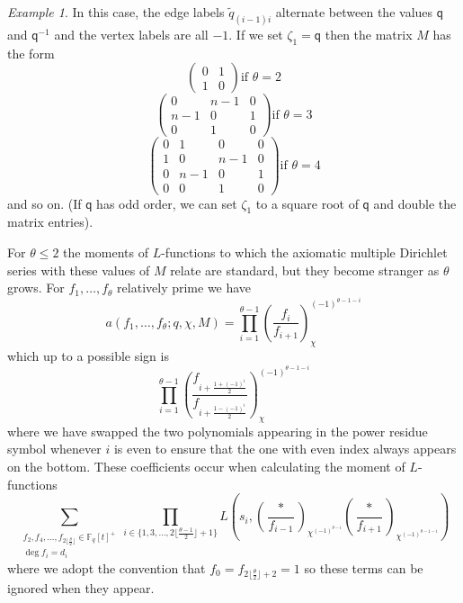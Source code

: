 \documentclass[11pt,letterpaper]{article}
\theoremstyle{definition}
\theoremstyle{remark}
\newtheorem{example}[theorem]{Example}
\numberwithin{equation}{section}
\theoremstyle{dotless}
\newcommand{\gene}{\zeta_1} %
\newcommand{\qq}{\mathbf{ \mathsf{q}}} %
\renewcommand{\tilde}{\widetilde}
\begin{document}
\begin{example}
In this case, the edge labels $\tilde{q}_{(i-1) i}$ alternate between the values $\qq$ and $\qq^{-1}$ and the vertex labels are all $-1$. If we set $\gene=\qq$ then the matrix $M$ has the form \[ \begin{pmatrix} 0 & 1 \\ 1 & 0 \end{pmatrix} \textrm{if } \theta=2\]\[ \begin{pmatrix} 0 & n-1 & 0  \\ n-1 & 0 & 1 \\ 0 & 1 & 0  \end{pmatrix} \textrm{if } \theta=3\]
\[ \begin{pmatrix} 0 & 1 & 0 & 0 \\ 1 & 0 & n-1 & 0 \\ 0 & n-1 & 0 & 1 \\ 0 & 0 & 1 & 0  \end{pmatrix} \textrm{if } \theta=4\]
and so on. (If $\qq$ has odd order, we can set $\gene$ to a square root of $\qq$ and double the matrix entries). 


For $\theta \leq 2$ the moments of $L$-functions to which the axiomatic multiple Dirichlet series with these values of $M$ relate are standard, but they become stranger as $\theta$ grows. For $f_1,\dots, f_\theta$ relatively prime we have
\[a(f_1,\dots,f_\theta; q, \chi, M) = \prod_{i=1}^{\theta-1} \left( \frac{f_i}{f_{i+1}} \right)_{\chi}^{ (-1)^{\theta-1-i}}\]
which up to a possible sign is
\[ \prod_{i=1}^{\theta-1} \left( \frac{f_{ i+ \frac{ 1 + (-1)^i}{2}}}{f_{i+\frac{ 1 - (-1)^i}{2}}} \right)_{\chi}^{ (-1)^{\theta-1-i}}\] where we have swapped the two polynomials appearing in the power residue symbol whenever $i$ is even to ensure that the one with even index always appears on the bottom. These coefficients occur when calculating the moment of $L$-functions
\[ \sum_{\substack{f_2,f_4,\dots, f_{2\lfloor \frac{\theta}{2} \rfloor} \in \mathbb F_q[t]^+\\ \deg f_i =d_i}} \prod_{i \in \{1,3,\dots,2\lfloor \frac{\theta-1}{2}\rfloor  +1\}}  L \left( s_i, \left( \frac{*}{f_{i-1} }\right)_{\chi^{(-1)^{\theta-i}}} \left( \frac{*}{f_{i+1}}\right)_{\chi^{(-1)^{\theta-1-i}}}\right) \] where we adopt the convention that $f_0 = f_{ 2\lfloor \frac{\theta}{2} \rfloor+2}=1$ so these terms can be ignored when they appear.  


\end{example}
\end{document}
